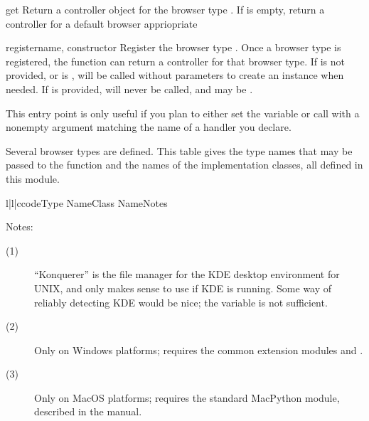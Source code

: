 \begin{funcdesc}{get}{}
  Return a controller object for the browser type .  If
   is empty, return a controller for a default browser
  appriopriate 
\end{funcdesc}

\begin{funcdesc}{register}{name, constructor}
  Register the browser type .  Once a browser type is
  registered, the  function can return a controller
  for that browser type.  If  is not provided, or is
  ,  will be called without parameters to
  create an instance when needed.  If  is provided,
   will never be called, and may be .

  This entry point is only useful if you plan to either set the
   variable or call  with a nonempty
  argument matching the name of a handler you declare.  
\end{funcdesc}

Several browser types are defined.  This table gives the type names
that may be passed to the  function and the names of
the implementation classes, all defined in this module.

\begin{tableiii}{l|l|c}{code}{Type Name}{Class Name}{Notes}
\end{tableiii}

\noindent
Notes:

\begin{description}
\item[(1)]
``Konquerer'' is the file manager for the KDE desktop environment for
UNIX, and only makes sense to use if KDE is running.  Some way of
reliably detecting KDE would be nice; the  variable is
not sufficient.

\item[(2)]
Only on Windows platforms; requires the common
extension modules  and .

\item[(3)]
Only on MacOS platforms; requires the standard MacPython 
module, described in the  manual.
\end{description}


